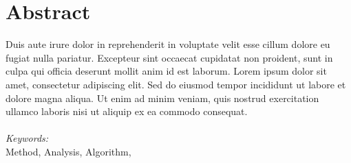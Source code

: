 %
\chapter*{Abstract}
\label{c:abstract}
%
Duis aute irure dolor in reprehenderit in voluptate velit esse cillum dolore eu fugiat nulla pariatur.
Excepteur sint occaecat cupidatat non proident, sunt in culpa qui officia deserunt mollit anim id est laborum.
Lorem ipsum dolor sit amet, consectetur adipiscing elit. 
Sed do eiusmod tempor incididunt ut labore et dolore magna aliqua. 
Ut enim ad minim veniam, quis nostrud exercitation ullamco laboris nisi ut aliquip ex ea commodo consequat.
\\ \\
\noindent \textit{Keywords:}\\
Method, Analysis, Algorithm,
%

